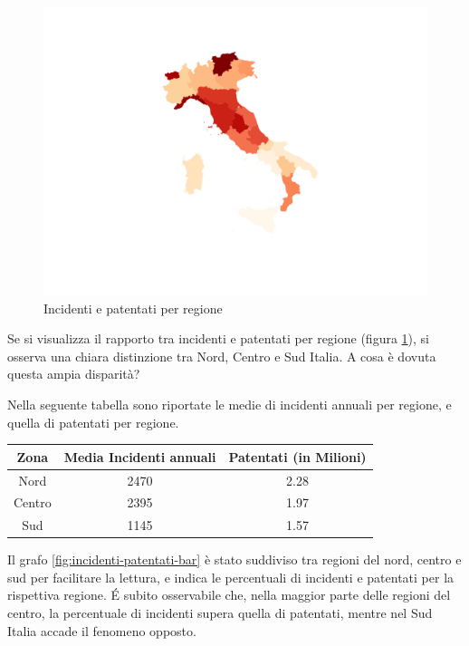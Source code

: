 \documentclass[a4paper,12pt]{report}
\begin{document}
\begin{figure}
    \includegraphics[width=0.8\linewidth]{../src/incidenti/incidenti_aci/mappe_regioni/incidenti_patenti_italia.png}
    \caption{Incidenti e patentati per regione}
    \label{fig:incidenti-patentati}
\end{figure}

Se si visualizza il rapporto tra incidenti e patentati per regione 
(figura \ref{fig:incidenti-patentati}), si osserva una chiara distinzione 
tra Nord, Centro e Sud Italia. 
A cosa è dovuta questa ampia disparità?

Nella seguente tabella sono riportate le medie di incidenti annuali per regione, 
e quella di patentati per regione.

\begin{center}
    \def\arraystretch{1.5}%
    \begin{tabular}{ |c|c|c| } 
    \hline
    Zona & Media Incidenti annuali & Patentati (in Milioni) \\ 
    \hline
    \rowcolor{TableGray}
    Nord    &   2470 &   2.28 \\ 
    Centro  &   2395 &   1.97 \\ 
    \rowcolor{TableGray}
    Sud     &   1145 &   1.57 \\ 
    \hline
    \end{tabular}
\end{center}

Il grafo \ref{fig:incidenti-patentati-bar} è stato suddiviso tra regioni del nord, 
centro e sud per facilitare la lettura, e indica le percentuali di incidenti e 
patentati per la rispettiva regione. 
\'E subito osservabile che, nella maggior parte delle regioni del centro, 
la percentuale di incidenti supera quella di patentati, 
mentre nel Sud Italia accade il fenomeno opposto.
\end{document}
